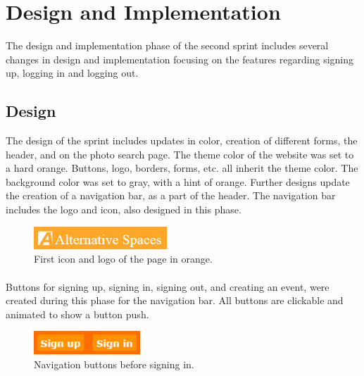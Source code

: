 \section{Design and Implementation} 
\label{sec:S2DesignImpl}
The design and implementation phase of the second sprint includes several changes in design and implementation focusing on the features regarding signing up, logging in and logging out. 

\subsection{Design}
\label{subsec:S2DesignImplDesign}
The design of the sprint includes updates in color, creation of different forms, the header, and on the photo search page. The theme color of the website was set to a hard orange. Buttons, logo, borders, forms, etc. all inherit the theme color. The background color was set to gray, with a hint of orange. Further designs update the creation of a navigation bar, as a part of the header. The navigation bar includes the logo and icon, also designed in this phase. \\%
%
\begin{figure}[ht!]
\centering
\includegraphics[width=50mm]{Sprint2/img/Sprint2-logo1.png}
\caption{First icon and logo of the page in orange. \label{overflow}}
\end{figure}

\paragraph{} Buttons for signing up, signing in, signing out, and creating an event, were created during this phase for the navigation bar. All buttons are clickable and animated to show a button push. \\%
%
\begin{figure}[ht!]
\centering
\includegraphics[width=40mm]{Sprint2/img/Sprint2-buttons1.png}
\caption{Navigation buttons before signing in. \label{overflow}}
\end{figure}

